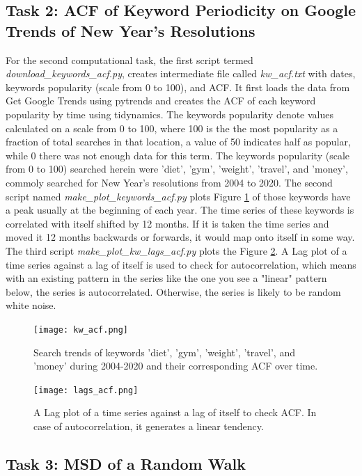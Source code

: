 \documentclass{article}
\begin{document}
\subsection{Task 2: ACF of Keyword Periodicity on Google Trends of New Year's Resolutions}

For the second computational task, the first script termed {\it download\_keywords\_acf.py}, creates intermediate file called {\it kw\_acf.txt} with dates, keywords popularity (scale from 0 to 100), and ACF. It first loads the data from Get Google Trends using pytrends and creates the ACF of each keyword popularity by time using tidynamics. The keywords popularity denote values calculated on a scale from 0 to 100, where 100 is the the most popularity as a fraction of total searches in that location, a value of 50 indicates half as popular, while 0 there was not enough data for this term. The keywords popularity (scale from 0 to 100) searched herein were 'diet', 'gym', 'weight', 'travel', and 'money', commoly searched for New Year's resolutions from 2004 to 2020. The second script named {\it make\_plot\_keywords\_acf.py} plots Figure \ref{fig:acf2_plot} of those keywords have a peak usually at the beginning of each year. The time series of these keywords is correlated with itself shifted by 12 months. If it is taken the time series and moved it 12 months backwards or forwards, it would map onto itself in some way. The third script {\it make\_plot\_kw\_lags\_acf.py} plots the Figure \ref{fig:lags_plot}. A Lag plot of a time series against a lag of itself is used to check for autocorrelation, which means with an existing pattern in the series like the one you see a "linear" pattern below, the series is autocorrelated. Otherwise, the series is likely to be random white noise.

\begin{figure}[H]
\centering
\texttt{[image: kw\_acf.png]}
\caption{Search trends of keywords 'diet', 'gym', 'weight', 'travel', and 'money' during 2004-2020 and their corresponding ACF over time.}
\label{fig:acf2_plot}
\end{figure}

\begin{figure}[H]
\centering
\texttt{[image: lags\_acf.png]}
\caption{A Lag plot of a time series against a lag of itself to check ACF. In case of autocorrelation, it generates a linear tendency.}
\label{fig:lags_plot}
\end{figure}

\subsection{Task 3: MSD of a Random Walk}
\end{document}
